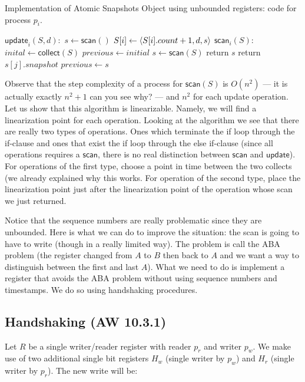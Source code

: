 \documentclass[twoside]{article}
\newcommand\updateF{\mathsf{update}}
\newcommand\scanF{\mathsf{scan}}
\newcommand\collectF{\mathsf{collect}}
\DeclarePairedDelimiter\anglebrac{\langle}{\rangle}
\begin{document}
\begin{algorithm}
	\caption{Implementation of Atomic Snapshots Object using unbounded registers: code for process $p_i$.}
    \label{pseudocode:atomicsnapshots}
    \begin{algorithmic}[1]
	\State $\updateF_i(S, d):$	
	\State $s \leftarrow \scanF()$
	\State $S[i] \leftarrow \anglebrac{S[i].count+1, d, s}$
	\State
	\State $\scanF_i(S):$
	\State $inital \leftarrow \collectF(S)$
	\State $previous \leftarrow initial$
		\State $s \leftarrow \scanF(S)$
			\State return $s$
			\State return $s[j].snapshot$
		\Else
			\State $previous \leftarrow s$
		\EndIf	
	\EndWhile			
	\end{algorithmic}
\end{algorithm}

Observe that the step complexity of a process for $\scanF(S)$ is $O(n^2)$ --- it is actually exactly $n^2 + 1$ can you see why? --- and $n^2$ for each update operation. Let us show that this algorithm is linearizable. Namely, we will find a linearization point for each operation. Looking at the algorithm we see that there are really two types of operations. Ones which terminate the if loop through the if-clause and ones that exist the if loop through the else if-clause (since all operations requires a $\scanF$, there is no real distinction between $\scanF$ and $\updateF$). For operations of the first type, choose a point in time between the two collects (we already explained why this works. For operation of the second type, place the linearization point just after the linearization point of the operation whose scan we just returned.

Notice that the sequence numbers are really problematic since they are unbounded. Here is what we can do to improve the situation: the scan is going to have to write (though in a really limited way). The problem is call the ABA problem (the register changed from $A$ to $B$ then back to $A$ and we want a way to distinguish between the first and last $A$). What we need to do is implement a register that avoids the ABA problem without using sequence numbers and timestamps. We do so using handshaking procedures.

\subsection{Handshaking (AW 10.3.1)}
 Let $R$ be a single writer/reader register with reader $p_r$ and writer $p_w$.  We make use of two additional single bit registers $H_w$ (single writer by $p_w$) and $H_r$ (single writer by $p_r$). The new write will be:
\end{document}
